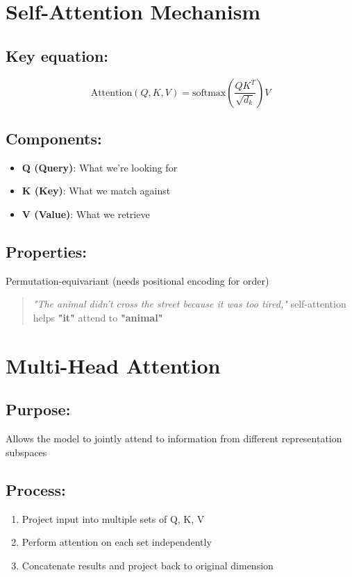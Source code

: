 \section{Self-Attention Mechanism}

\subsection*{Key equation:}
\[
\text{Attention}(Q, K, V) = \text{softmax}\left(\frac{QK^T}{\sqrt{d_k}}\right)V
\]

\subsection*{Components:}
\begin{itemize}
    \item \textbf{Q (Query)}: What we're looking for
    \item \textbf{K (Key)}: What we match against
    \item \textbf{V (Value)}: What we retrieve
\end{itemize}

\subsection*{Properties:}
Permutation-equivariant (needs positional encoding for order)

\begin{example}
\begin{quote}
\textit{"The animal didn't cross the street because it was too tired,"} self-attention helps \textbf{"it"} attend to \textbf{"animal"}
\end{quote}
\end{example}

\section{Multi-Head Attention}

\subsection*{Purpose:}
Allows the model to jointly attend to information from different representation subspaces

\subsection*{Process:}
\begin{enumerate}
    \item Project input into multiple sets of Q, K, V
    \item Perform attention on each set independently
    \item Concatenate results and project back to original dimension
\end{enumerate}

